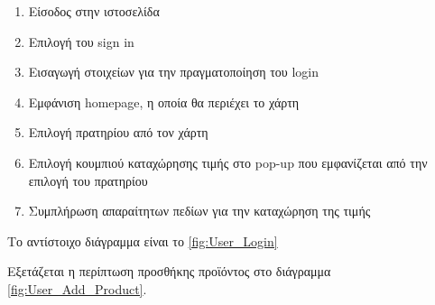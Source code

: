 \begin{enumerate}
	\item Είσοδος στην ιστοσελίδα
	\item Επιλογή του sign in
	\item Εισαγωγή στοιχείων για την πραγματοποίηση του login
	\item Εμφάνιση homepage, η οποία θα περιέχει το χάρτη
	\item Επιλογή πρατηρίου από τον χάρτη
	\item Επιλογή κουμπιού καταχώρησης τιμής στο pop-up που εμφανίζεται από την επιλογή του πρατηρίου
	\item Συμπλήρωση απαραίτητων πεδίων για την καταχώρηση της τιμής
\end{enumerate}
Το αντίστοιχο διάγραμμα είναι το \ref{fig:User_Login}

Εξετάζεται η περίπτωση προσθήκης προϊόντος στο διάγραμμα \ref{fig:User_Add_Product}.




